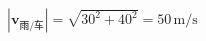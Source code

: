 \documentclass[border=2.5pt]{standalone}
\begin{document}
$\displaystyle |\bm v_{\text{雨/车}}|=\sqrt{30^2+40^2}=50\,\mathrm{m/s}$
\end{document}
